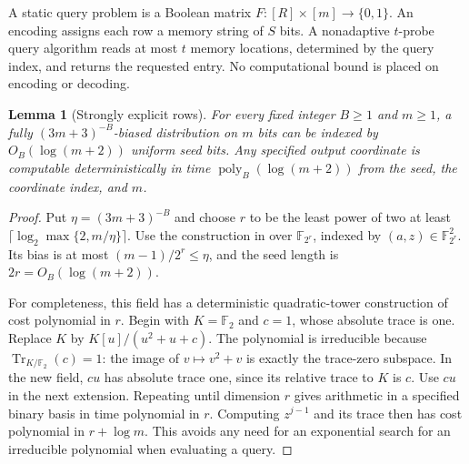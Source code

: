 \documentclass[letterpaper,11pt]{article}
\newtheorem{lemma}[theorem]{Lemma}
\theoremstyle{definition}
\newcommand{\F}{\mathbb F}
\DeclareMathOperator{\poly}{poly}
\begin{document}
A static query problem is a Boolean matrix $F:[R]\times[m]\to\{0,1\}$.
An encoding assigns each row a memory string of $S$ bits. A nonadaptive
$t$-probe query algorithm reads at most $t$ memory locations, determined
by the query index, and returns the requested entry. No computational
bound is placed on encoding or decoding.

\begin{lemma}[Strongly explicit rows]\label{lem:explicit-rows}
For every fixed integer $B\ge1$ and $m\ge1$, a fully
$(3m+3)^{-B}$-biased distribution on $m$ bits can be indexed by
$O_B(\log(m+2))$ uniform seed bits. Any specified output coordinate
is computable deterministically in time $\poly_B(\log(m+2))$ from
the seed, the coordinate index, and $m$.
\end{lemma}
\begin{proof}
Put $\eta=(3m+3)^{-B}$ and choose $r$ to be the least power of two
at least $\lceil\log_2\max\{2,m/\eta\}\rceil$. Use the construction
in  over $\F_{2^r}$, indexed by
$(a,z)\in\F_{2^r}^2$. Its bias is at most $(m-1)/2^r\le\eta$,
and the seed length is $2r=O_B(\log(m+2))$.

For completeness, this field has a deterministic quadratic-tower
construction of cost polynomial in $r$. Begin with $K=\F_2$ and
$c=1$, whose absolute trace is one. Replace $K$ by
$K[u]/(u^2+u+c)$. The polynomial is irreducible because
$\operatorname{Tr}_{K/\F_2}(c)=1$: the image of $v\mapsto v^2+v$
is exactly the trace-zero subspace. In the new field, $cu$ has
absolute trace one, since its relative trace to $K$ is $c$.
Use $cu$ in the next extension. Repeating until dimension $r$
gives arithmetic in a specified binary basis in time polynomial
in $r$. Computing $z^{j-1}$ and its trace then has cost polynomial
in $r+\log m$. This avoids any need for an exponential search for
an irreducible polynomial when evaluating a query.
\end{proof}
\end{document}
